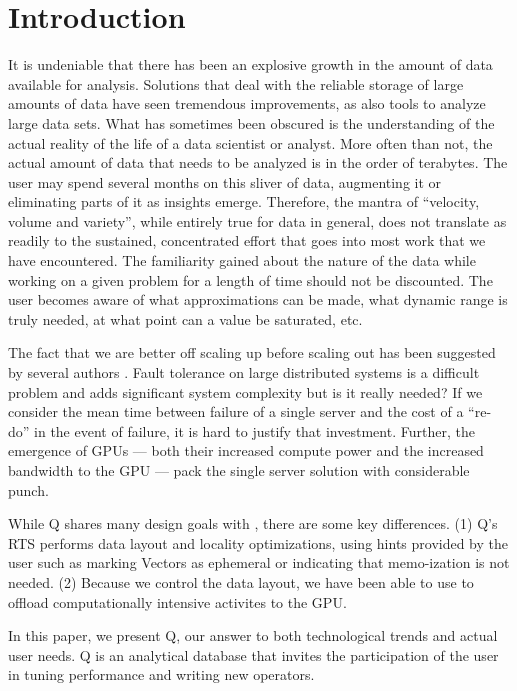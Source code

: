 \section{Introduction}

It is undeniable that there has been an explosive growth in the 
amount of data available for analysis. Solutions that 
deal with the reliable storage of large amounts of data have seen tremendous
improvements, as also tools to analyze large data sets. What has sometimes been
obscured is the understanding of the actual reality of the life of a data
scientist or analyst. More often than not, the actual amount of data that needs
to be analyzed is in the order of terabytes\cite{Dittrich2015}. The user may spend
several months on this sliver of data, augmenting it or eliminating parts of it
as insights emerge. Therefore, the mantra of ``velocity, volume and variety'',
while entirely true for data in general, does not translate as readily to the
sustained, concentrated effort that goes into most work that we have
encountered. The familiarity gained about the nature of the data 
while working on a given problem for a length of time should not be discounted. The
user becomes aware of what approximations can be made, what dynamic range is
truly needed, at what point can a value be saturated, etc.

The fact that we are better off scaling up before scaling out has been suggested
by several authors \cite{Rowstron2012,Dittrich2015,McSherry2015}. 
Fault tolerance on large distributed systems is a difficult
problem and adds significant system complexity but is it really needed?
If we consider the mean time between failure of a single server and
the cost of a ``re-do'' in the event of failure,
it is hard to justify that investment. 
Further, the emergence of GPUs --- both their increased compute power and the
increased  bandwidth to the GPU --- pack the single server solution with
considerable punch.

While Q shares many design goals with \cite{Weld2017}, there are some key
differences. (1) Q's RTS performs data layout and locality optimizations, 
using hints provided by the user such as marking Vectors as 
ephemeral or indicating that memo-ization is not needed. (2) Because we control
the data layout, we have been able to use \cite{UnifiedMemory2018} to offload
computationally intensive activites to the GPU.

In this paper, we present Q, our answer to both technological trends and actual
user needs. Q is an analytical database that invites the participation of the
user in tuning performance and writing new operators. 

